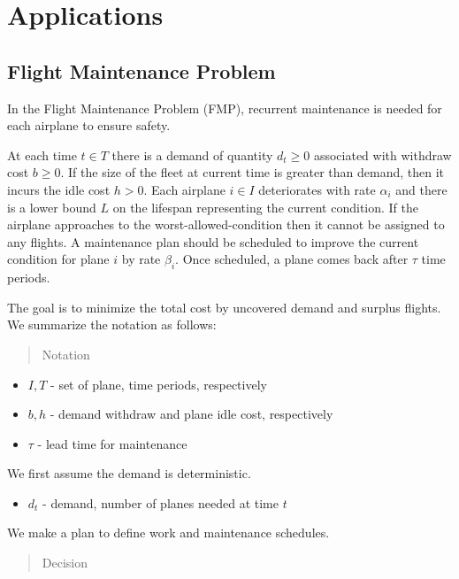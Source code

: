 \documentclass[../main]{subfiles}
\begin{document}
\section{Applications}\label{sec:app}

\subsection{Flight Maintenance Problem}\label{sec:fmp}

In the Flight Maintenance Problem (FMP), recurrent maintenance is needed for each airplane to ensure safety.

At each time \(t \in T\) there is a demand of quantity \(d_t \ge 0\) associated with withdraw cost \(b \ge 0\).
If the size of the fleet at current time is greater than demand, then it incurs the idle cost \(h > 0\).
Each airplane \(i \in I\) deteriorates with rate \(\alpha_i\) and there is a lower bound \(L\) on the lifespan representing the current condition. If the airplane approaches to the worst-allowed-condition then it cannot be assigned to any flights.
A maintenance plan should be scheduled to improve the current condition for plane \(i\) by rate \(\beta_i\). Once scheduled, a plane comes back after \(\tau\) time periods.

The goal is to minimize the total cost by uncovered demand and surplus flights. We summarize the notation as follows:

\begin{quote}
  Notation
\end{quote}

\begin{itemize}
  \tightlist
  \item
        \(I, T\) - set of plane, time periods, respectively
  \item
        \(b, h\) - demand withdraw and plane idle cost, respectively
  \item
        \(\tau\) - lead time for maintenance
\end{itemize}

We first assume the demand is deterministic.

\begin{itemize}
  \tightlist
  \item
        \(d_t\) - demand, number of planes needed at time \(t\)
\end{itemize}

We make a plan to define work and maintenance schedules.

\begin{quote}
  Decision
\end{quote}
\end{document}
